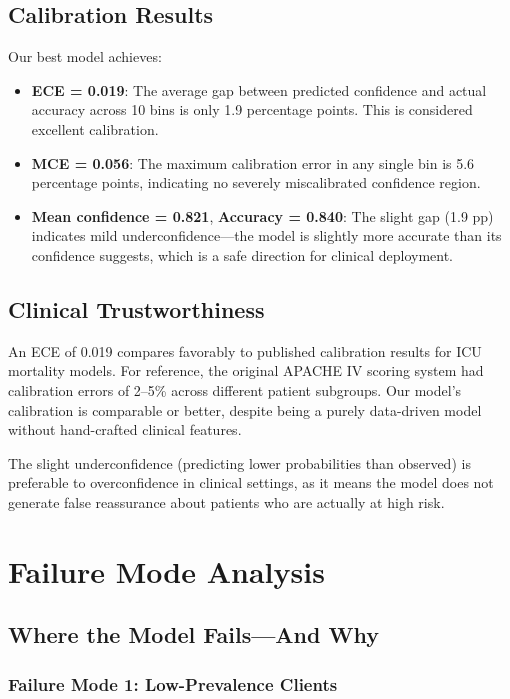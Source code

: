\documentclass[11pt,a4paper]{report}
\begin{document}
\section{Calibration Results}

Our best model achieves:
\begin{itemize}[leftmargin=2em]
\item \textbf{ECE = 0.019}: The average gap between predicted confidence and actual accuracy across 10 bins is only 1.9 percentage points. This is considered excellent calibration.
\item \textbf{MCE = 0.056}: The maximum calibration error in any single bin is 5.6 percentage points, indicating no severely miscalibrated confidence region.
\item \textbf{Mean confidence = 0.821}, \textbf{Accuracy = 0.840}: The slight gap (1.9 pp) indicates mild underconfidence---the model is slightly more accurate than its confidence suggests, which is a safe direction for clinical deployment.
\end{itemize}

\section{Clinical Trustworthiness}

An ECE of 0.019 compares favorably to published calibration results for ICU mortality models. For reference, the original APACHE IV scoring system had calibration errors of 2--5\% across different patient subgroups. Our model's calibration is comparable or better, despite being a purely data-driven model without hand-crafted clinical features.

The slight underconfidence (predicting lower probabilities than observed) is preferable to overconfidence in clinical settings, as it means the model does not generate false reassurance about patients who are actually at high risk.


\chapter{Failure Mode Analysis}

\section{Where the Model Fails---And Why}

\subsection{Failure Mode 1: Low-Prevalence Clients}
\end{document}
